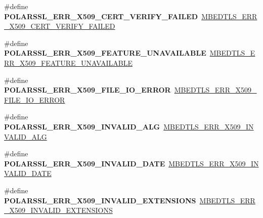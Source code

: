 \begin{DoxyCompactItemize}
\#define {\bfseries P\+O\+L\+A\+R\+S\+S\+L\+\_\+\+E\+R\+R\+\_\+\+X509\+\_\+\+C\+E\+R\+T\+\_\+\+V\+E\+R\+I\+F\+Y\+\_\+\+F\+A\+I\+L\+ED}~\mbox{\hyperlink{group__x509__module_gaba46df0041dcf48fa9d164d28cf3a154}{M\+B\+E\+D\+T\+L\+S\+\_\+\+E\+R\+R\+\_\+\+X509\+\_\+\+C\+E\+R\+T\+\_\+\+V\+E\+R\+I\+F\+Y\+\_\+\+F\+A\+I\+L\+ED}}
\item 
\mbox{\label{compat-1_83_8h_aa1ff85472d1f06bac7aadef70dbc404f}} 
\#define {\bfseries P\+O\+L\+A\+R\+S\+S\+L\+\_\+\+E\+R\+R\+\_\+\+X509\+\_\+\+F\+E\+A\+T\+U\+R\+E\+\_\+\+U\+N\+A\+V\+A\+I\+L\+A\+B\+LE}~\mbox{\hyperlink{group__x509__module_ga185bc7f27a2b1f7742537a2377c52ee3}{M\+B\+E\+D\+T\+L\+S\+\_\+\+E\+R\+R\+\_\+\+X509\+\_\+\+F\+E\+A\+T\+U\+R\+E\+\_\+\+U\+N\+A\+V\+A\+I\+L\+A\+B\+LE}}
\item 
\mbox{\label{compat-1_83_8h_a87e65fdadeba914a5555ef09ab35c48b}} 
\#define {\bfseries P\+O\+L\+A\+R\+S\+S\+L\+\_\+\+E\+R\+R\+\_\+\+X509\+\_\+\+F\+I\+L\+E\+\_\+\+I\+O\+\_\+\+E\+R\+R\+OR}~\mbox{\hyperlink{group__x509__module_gad85d9c7aa5c30b9730297bef3386407c}{M\+B\+E\+D\+T\+L\+S\+\_\+\+E\+R\+R\+\_\+\+X509\+\_\+\+F\+I\+L\+E\+\_\+\+I\+O\+\_\+\+E\+R\+R\+OR}}
\item 
\mbox{\label{compat-1_83_8h_ac2a509391d78d52ac972979a8c149aaa}} 
\#define {\bfseries P\+O\+L\+A\+R\+S\+S\+L\+\_\+\+E\+R\+R\+\_\+\+X509\+\_\+\+I\+N\+V\+A\+L\+I\+D\+\_\+\+A\+LG}~\mbox{\hyperlink{group__x509__module_gae16cddbd42e08f6dd093cf4326e59413}{M\+B\+E\+D\+T\+L\+S\+\_\+\+E\+R\+R\+\_\+\+X509\+\_\+\+I\+N\+V\+A\+L\+I\+D\+\_\+\+A\+LG}}
\item 
\mbox{\label{compat-1_83_8h_a4c0033b4b5ea413f79b133b9172d967b}} 
\#define {\bfseries P\+O\+L\+A\+R\+S\+S\+L\+\_\+\+E\+R\+R\+\_\+\+X509\+\_\+\+I\+N\+V\+A\+L\+I\+D\+\_\+\+D\+A\+TE}~\mbox{\hyperlink{group__x509__module_gac36bf085ce8f7f57f039bda8828bd824}{M\+B\+E\+D\+T\+L\+S\+\_\+\+E\+R\+R\+\_\+\+X509\+\_\+\+I\+N\+V\+A\+L\+I\+D\+\_\+\+D\+A\+TE}}
\item 
\mbox{\label{compat-1_83_8h_aefb797397f3fc132f0d825b77b10ff47}} 
\#define {\bfseries P\+O\+L\+A\+R\+S\+S\+L\+\_\+\+E\+R\+R\+\_\+\+X509\+\_\+\+I\+N\+V\+A\+L\+I\+D\+\_\+\+E\+X\+T\+E\+N\+S\+I\+O\+NS}~\mbox{\hyperlink{group__x509__module_gaa0788dbf0325aea4ab566717514b4422}{M\+B\+E\+D\+T\+L\+S\+\_\+\+E\+R\+R\+\_\+\+X509\+\_\+\+I\+N\+V\+A\+L\+I\+D\+\_\+\+E\+X\+T\+E\+N\+S\+I\+O\+NS}}

\end{DoxyCompactItemize}
